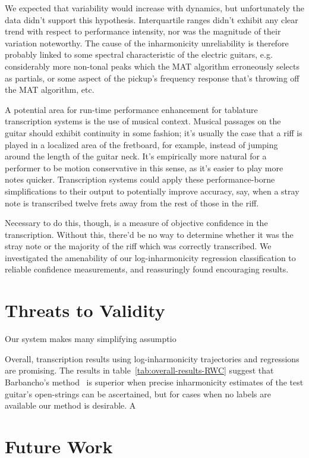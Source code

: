 \documentclass[12pt]{cmuthesis}
\begin{document}
We expected that variability would increase with dynamics, but unfortunately the data didn't support this hypothesis. Interquartile ranges didn't exhibit any clear trend with respect to performance intensity, nor was the magnitude of their variation noteworthy. The cause of the inharmonicity unreliability is therefore probably linked to some spectral characteristic of the electric guitars, e.g. considerably more non-tonal peaks which the MAT algorithm erroneously selects as partials, or some aspect of the pickup's frequency response that's throwing off the MAT algorithm, etc.

A potential area for run-time performance enhancement for tablature transcription systems is the use of musical context. Musical passages on the guitar should exhibit continuity in some fashion; it's usually the case that a riff is played in a localized area of the fretboard, for example, instead of jumping around the length of the guitar neck. It's empirically more natural for a performer to be motion conservative in this sense, as it's easier to play more notes quicker. Transcription systems could apply these performance-borne simplifications to their output to potentially improve accuracy, say, when a stray note is transcribed twelve frets away from the rest of those in the riff.

Necessary to do this, though, is a measure of objective confidence in the transcription. Without this, there'd be no way to determine whether it was the stray note or the majority of the riff which was correctly transcribed. We investigated the amenability of our log-inharmonicity regression classification to reliable confidence measurements, and reassuringly found encouraging results.

\section{Threats to Validity}
Our system makes many simplifying assumptio

Overall, transcription results using log-inharmonicity trajectories and regressions are promising. The results in table~\ref{tab:overall-results-RWC} suggest that Barbancho's method~\cite{barbanchoi2012} is superior when precise inharmonicity estimates of the test guitar's open-strings can be ascertained, but for cases when no labels are available our method is desirable. A 
\section{Future Work}
\end{document}
